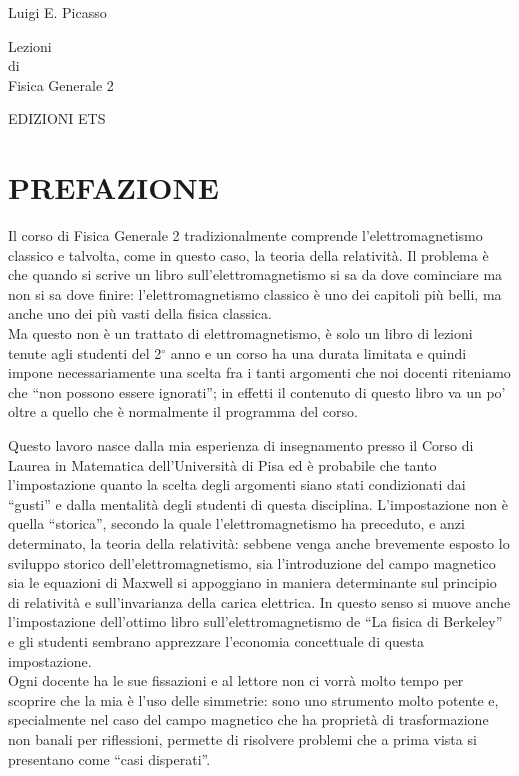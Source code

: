\begin{titlepage}
  \centering
  {\Large Luigi E. Picasso\par}
  \vspace{3cm}
  {\Huge Lezioni\\[0.3em] di\\[0.3em] Fisica Generale 2\par}
  \vfill
  {\large EDIZIONI ETS\par}
\end{titlepage}

\renewcommand{\contentsname}{INDICE}
\tableofcontents
\clearpage

\section*{PREFAZIONE}

Il corso di Fisica Generale 2 tradizionalmente comprende l'elettromagnetismo
classico e talvolta, come in questo caso, la teoria della relativit\`a. Il
problema \`e che quando si scrive un libro sull'elettromagnetismo si sa da dove
cominciare ma non si sa dove finire: l'elettromagnetismo classico \`e uno dei
capitoli pi\`u belli, ma anche uno dei pi\`u vasti della fisica classica.\\
Ma questo non \`e un trattato di elettromagnetismo, \`e solo un libro di lezioni
tenute agli studenti del 2$^\circ$ anno e un corso ha una durata limitata e
quindi impone necessariamente una scelta fra i tanti argomenti che noi docenti
riteniamo che ``non possono essere ignorati''; in effetti il contenuto di questo
libro va un po' oltre a quello che \`e normalmente il programma del corso.

Questo lavoro nasce dalla mia esperienza di insegnamento presso il Corso di
Laurea in Matematica dell'Universit\`a di Pisa ed \`e probabile che tanto
l'impostazione quanto la scelta degli argomenti siano stati condizionati dai
``gusti'' e dalla mentalit\`a degli studenti di questa disciplina.
L'impostazione non \`e quella ``storica'', secondo la quale l'elettromagnetismo
ha preceduto, e anzi determinato, la teoria della relativit\`a: sebbene venga
anche brevemente esposto lo sviluppo storico dell'elettromagnetismo, sia
l'introduzione del campo magnetico sia le equazioni di Maxwell si appoggiano in
maniera determinante sul principio di relativit\`a e sull'invarianza della
carica elettrica. In questo senso si muove anche l'impostazione dell'ottimo
libro sull'elettromagnetismo de ``La fisica di Berkeley'' e gli studenti
sembrano apprezzare l'economia concettuale di questa impostazione.\\
Ogni docente ha le sue fissazioni e al lettore non ci vorr\`a molto tempo per
scoprire che la mia \`e l'uso delle simmetrie: sono uno strumento molto potente
e, specialmente nel caso del campo magnetico che ha propriet\`a di
trasformazione non banali per riflessioni, permette di risolvere problemi che a
prima vista si presentano come ``casi disperati''.

